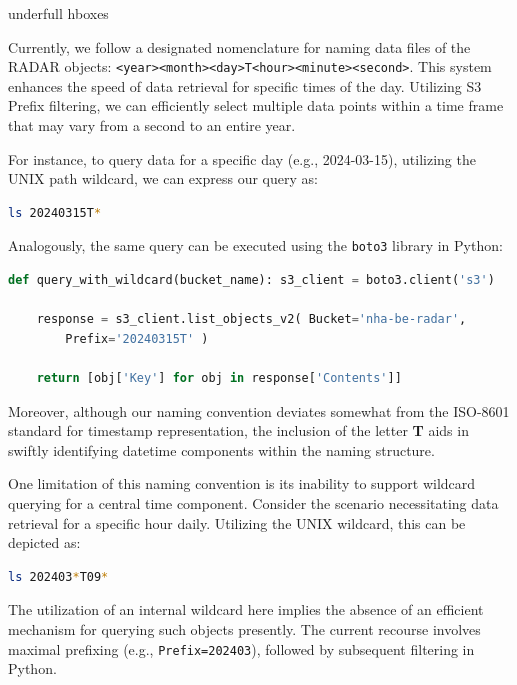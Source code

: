 \setlength{\emergencystretch}{3em} %
underfull hboxes

Currently, we follow a designated nomenclature for naming data files of the
RADAR objects: \texttt{<year><month><day>T<hour><minute><second>}. This system
enhances the speed of data retrieval for specific times of the day. Utilizing S3
Prefix filtering, we can efficiently select multiple data points within a time
frame that may vary from a second to an entire year.

For instance, to query data for a specific day (e.g., 2024-03-15), utilizing the
UNIX path wildcard, we can express our query as:

\begin{lstlisting}[language=sh]
ls 20240315T*
\end{lstlisting}

Analogously, the same query can be executed using the \texttt{boto3} library in
Python:

\begin{lstlisting}[language=Python, caption={Querying data in 2024-03-15}]
def query_with_wildcard(bucket_name): s3_client = boto3.client('s3')
    
    response = s3_client.list_objects_v2( Bucket='nha-be-radar',
        Prefix='20240315T' )
        
    return [obj['Key'] for obj in response['Contents']]
\end{lstlisting}

Moreover, although our naming convention deviates somewhat from the ISO-8601
standard for timestamp representation, the inclusion of the letter \textbf{T}
aids in swiftly identifying datetime components within the naming structure.

One limitation of this naming convention is its inability to support wildcard
querying for a central time component. Consider the scenario necessitating data
retrieval for a specific hour daily. Utilizing the UNIX wildcard, this can be
depicted as:

\begin{lstlisting}[language=sh]
ls 202403*T09*
\end{lstlisting}

The utilization of an internal wildcard here implies the absence of an efficient
mechanism for querying such objects presently. The current recourse involves
maximal prefixing (e.g., \texttt{Prefix=202403}), followed by subsequent
filtering in Python.


